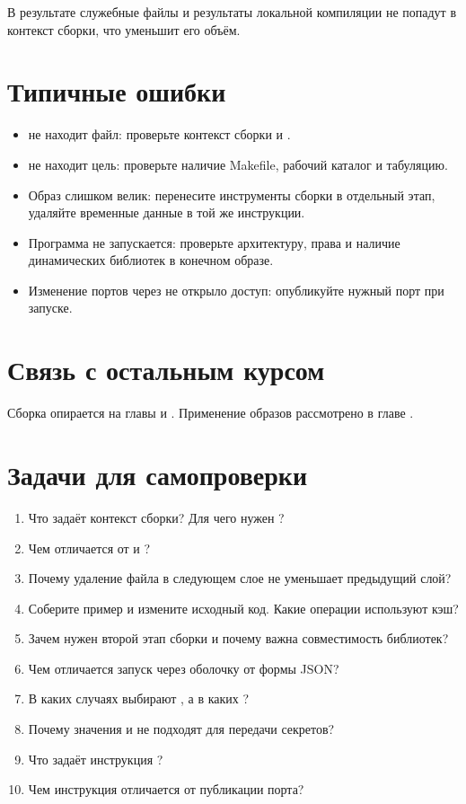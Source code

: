 В результате служебные файлы и результаты локальной компиляции не попадут в контекст сборки, что уменьшит его объём.

\par\pagebreak[4]
\section{Типичные ошибки}
\begin{itemize}[nosep]
  \item {} не находит файл: проверьте контекст сборки и .
  \item {} не находит цель: проверьте наличие Makefile, рабочий каталог и табуляцию.
  \item Образ слишком велик: перенесите инструменты сборки в отдельный этап, удаляйте временные данные в той же инструкции.
  \item Программа не запускается: проверьте архитектуру, права и наличие динамических библиотек в конечном образе.
  \item Изменение портов через  не открыло доступ: опубликуйте нужный порт при запуске.
\end{itemize}

\section{Связь с остальным курсом}

Сборка опирается на главы  и . Применение образов рассмотрено в главе .

\section{Задачи для самопроверки}
\begin{enumerate}[nosep]
  \item Что задаёт контекст сборки? Для чего нужен ?
  \item Чем  отличается от  и ?
  \item Почему удаление файла в следующем слое не уменьшает предыдущий слой?
  \item Соберите пример и измените исходный код. Какие операции используют кэш?
  \item Зачем нужен второй этап сборки и почему важна совместимость библиотек?
  \item Чем отличается запуск через оболочку от формы JSON?
  \item В каких случаях выбирают , а в каких ?
  \item Почему значения  и  не подходят для передачи секретов?
  \item Что задаёт инструкция ?
  \item Чем инструкция  отличается от публикации порта?
\end{enumerate}
\par
\clearpage
\endgroup